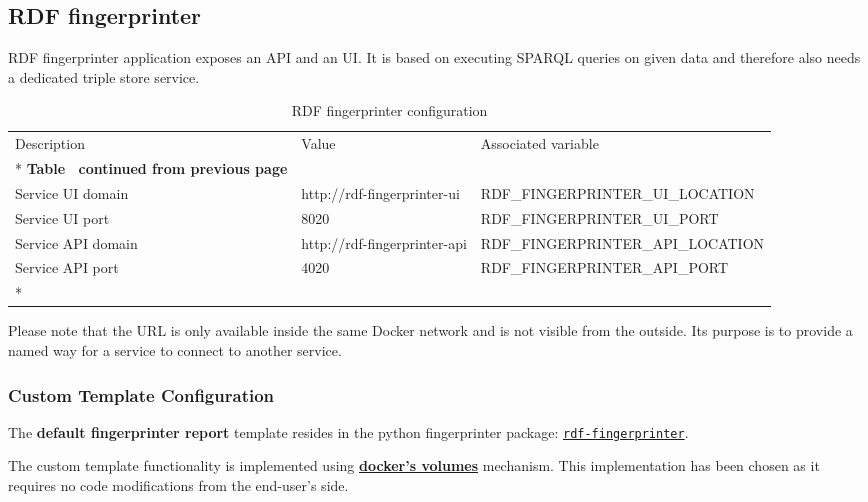 	\subsection{RDF fingerprinter}
	
	RDF fingerprinter application exposes an API and an UI. It is based on executing SPARQL queries on given data and therefore also needs a dedicated triple store service. 

	\begin{longtable}[c]{@{}p{3.8cm}p{3cm}l@{}}
		\toprule
		Description & Value & Associated variable \\* \midrule
		\endfirsthead
		\multicolumn{3}{c}%
		{{\bfseries Table \thetable\ continued from previous page}} \\
		\endhead
		\bottomrule
		\endfoot
		\endlastfoot
		Service UI domain & http://rdf-fingerprinter-ui & RDF\_FINGERPRINTER\_UI\_LOCATION \\
		Service UI port & 8020 & RDF\_FINGERPRINTER\_UI\_PORT \\
		Service API domain & http://rdf-fingerprinter-api & RDF\_FINGERPRINTER\_API\_LOCATION \\
		Service API port & 4020 & RDF\_FINGERPRINTER\_API\_PORT \\* \bottomrule
		\caption{RDF fingerprinter configuration}
		\label{tab:my-table7}\\
	\end{longtable}

	Please note that the URL is only available inside the same Docker network and is not visible from the outside. Its purpose is to provide a named way for a service to connect to another service.
	
	\subsubsection{Custom Template Configuration}
	\label{sec:rdf-fingerprinter-ct}
	
		The \textbf{default fingerprinter report} template resides in the python fingerprinter package: \href{https://github.com/meaningfy-ws/rdf-fingerprinter/tree/master/fingerprint_report_templates/fingerprint_report}{\texttt{rdf-fingerprinter}}.

		The custom template functionality is implemented using \textbf{\href{https://docs.docker.com/storage/volumes/}{docker's volumes}} mechanism. This implementation has been chosen as it requires no code modifications from the end-user's side.

